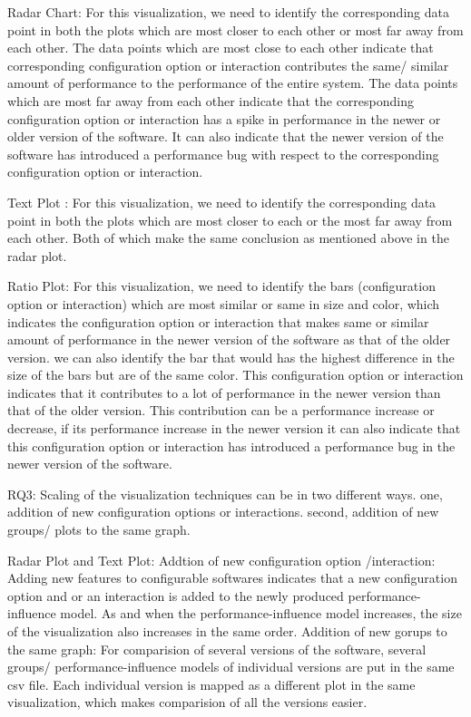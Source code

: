 Radar Chart: For this visualization, we need to identify the corresponding data point in both the plots which are most closer to each other or most far away from each other. The data points which are most close to each other indicate that  corresponding configuration option or interaction contributes the same/ similar amount of performance to the performance of the entire system. The data points which are most far away from each other indicate  that the corresponding configuration option or interaction has a spike in performance in the newer or older version of the software. It can also indicate that the newer version of the software has introduced a performance bug with respect to the corresponding configuration option or interaction. 

Text Plot : For this visualization, we need to identify the corresponding data point in both the plots which are most closer to each or the most far away from each other. Both of which make the same conclusion as mentioned above in the radar plot.

Ratio Plot: For this visualization, we need to identify the bars (configuration option or interaction) which are most similar or same in size and color, which indicates the configuration option or interaction that makes same or similar amount of performance in the newer version of the software as that of the older version. we can also identify the bar that would has the highest difference in the size of the bars but are of the same color. This configuration option or interaction indicates that it contributes to a lot of performance in the newer version than that of the older version. This contribution can be a performance increase or decrease, if its performance increase in the newer version it can also indicate that this configuration option or interaction has introduced a performance bug in the newer version of the software.

RQ3: Scaling of the visualization techniques can be in two different ways. one, addition of new configuration options or interactions. second, addition of new groups/ plots to the same graph.

Radar Plot and Text Plot: 
Addtion of new configuration option /interaction: Adding new features to configurable softwares indicates that a new configuration option and or an interaction is added to the newly produced performance-influence model. As and when the performance-influence model increases, the size of the visualization also increases in the same order.
Addition of new gorups to the same graph: For comparision of several versions of the software, several groups/ performance-influence models of individual versions are put in the same csv file. Each individual version is mapped as a different plot in the same visualization, which makes comparision of all the versions easier.

